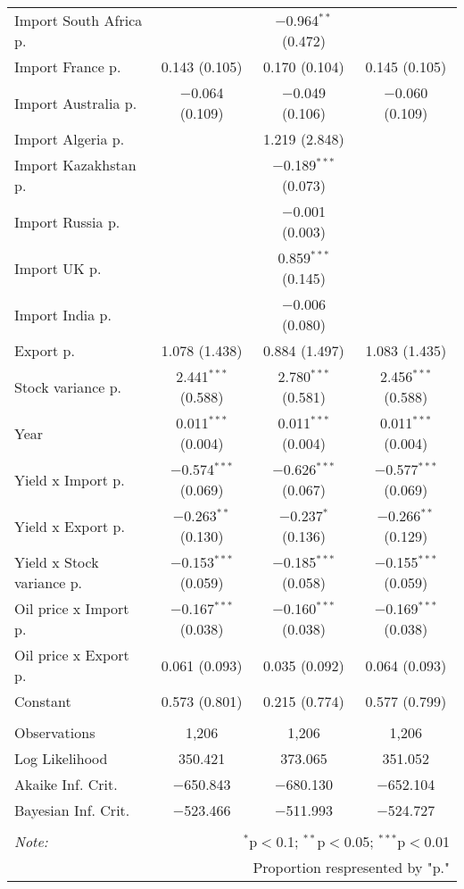 \begin{table}[H]
\begin{tabular}{@{\extracolsep{5pt}}lccc}
  Import South Africa p. &  & $-$0.964$^{**}$ (0.472) &  \\ 
  Import France p. & 0.143 (0.105) & 0.170 (0.104) & 0.145 (0.105) \\ 
  Import Australia p. & $-$0.064 (0.109) & $-$0.049 (0.106) & $-$0.060 (0.109) \\ 
  Import Algeria p. &  & 1.219 (2.848) &  \\ 
  Import Kazakhstan p. &  & $-$0.189$^{***}$ (0.073) &  \\ 
  Import Russia p. &  & $-$0.001 (0.003) &  \\ 
  Import UK p. &  & 0.859$^{***}$ (0.145) &  \\ 
  Import India p. &  & $-$0.006 (0.080) &  \\ 
  Export p. & 1.078 (1.438) & 0.884 (1.497) & 1.083 (1.435) \\ 
  Stock variance p. & 2.441$^{***}$ (0.588) & 2.780$^{***}$ (0.581) & 2.456$^{***}$ (0.588) \\ 
  Year & 0.011$^{***}$ (0.004) & 0.011$^{***}$ (0.004) & 0.011$^{***}$ (0.004) \\ 
  Yield x Import p. & $-$0.574$^{***}$ (0.069) & $-$0.626$^{***}$ (0.067) & $-$0.577$^{***}$ (0.069) \\ 
  Yield x Export p. & $-$0.263$^{**}$ (0.130) & $-$0.237$^{*}$ (0.136) & $-$0.266$^{**}$ (0.129) \\ 
  Yield x Stock variance p. & $-$0.153$^{***}$ (0.059) & $-$0.185$^{***}$ (0.058) & $-$0.155$^{***}$ (0.059) \\ 
  Oil price x Import p. & $-$0.167$^{***}$ (0.038) & $-$0.160$^{***}$ (0.038) & $-$0.169$^{***}$ (0.038) \\ 
  Oil price x Export p. & 0.061 (0.093) & 0.035 (0.092) & 0.064 (0.093) \\ 
  Constant & 0.573 (0.801) & 0.215 (0.774) & 0.577 (0.799) \\ 
 \hline \\[-1.8ex] 
Observations & 1,206 & 1,206 & 1,206 \\ 
Log Likelihood & 350.421 & 373.065 & 351.052 \\ 
Akaike Inf. Crit. & $-$650.843 & $-$680.130 & $-$652.104 \\ 
Bayesian Inf. Crit. & $-$523.466 & $-$511.993 & $-$524.727 \\ 
\hline 
\hline \\[-1.8ex] 
\textit{Note:}  & \multicolumn{3}{r}{$^{*}$p$<$0.1; $^{**}$p$<$0.05; $^{***}$p$<$0.01} \\ 
 & \multicolumn{3}{r}{Proportion respresented by "p."} \\ 
\end{tabular} 
\end{table} 
